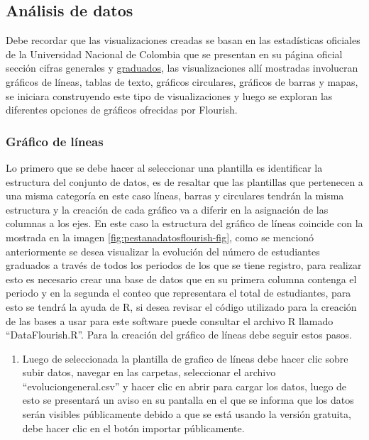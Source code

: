 \documentclass[
]{book}
\providecommand{\tightlist}{%
  \setlength{\itemsep}{0pt}\setlength{\parskip}{0pt}}
\begin{document}
\hypertarget{anuxe1lisis-de-datos}{%
\subsection{Análisis de datos}\label{anuxe1lisis-de-datos}}

Debe recordar que las visualizaciones creadas se basan en las estadísticas oficiales de la Universidad Nacional de Colombia que se presentan en su página oficial sección cifras generales y \href{http://estadisticas.unal.edu.co/menu-principal/cifras-generales/cifras-generales/?tx_estadisticaunal_listcategorias\%5Bcategoria\%5D=16\&tx_estadisticaunal_listcategorias\%5Baction\%5D=show\&tx_estadisticaunal_listcategorias\%5Bcontroller\%5D=Categoria\&cHash=bd354edbd23f35d536276c079984177c}{graduados}, las visualizaciones allí mostradas involucran gráficos de líneas, tablas de texto, gráficos circulares, gráficos de barras y mapas, se iniciara construyendo este tipo de visualizaciones y luego se exploran las diferentes opciones de gráficos ofrecidas por Flourish.

\hypertarget{graficolineasflourish}{%
\subsubsection{Gráfico de líneas}\label{graficolineasflourish}}

Lo primero que se debe hacer al seleccionar una plantilla es identificar la estructura del conjunto de datos, es de resaltar que las plantillas que pertenecen a una misma categoría en este caso líneas, barras y circulares tendrán la misma estructura y la creación de cada gráfico va a diferir en la asignación de las columnas a los ejes. En este caso la estructura del gráfico de líneas coincide con la mostrada en la imagen \ref{fig:pestanadatosflourish-fig}, como se mencionó anteriormente se desea visualizar la evolución del número de estudiantes graduados a través de todos los periodos de los que se tiene registro, para realizar esto es necesario crear una base de datos que en su primera columna contenga el periodo y en la segunda el conteo que representara el total de estudiantes, para esto se tendrá la ayuda de R, si desea revisar el código utilizado para la creación de las bases a usar para este software puede consultar el archivo R llamado ``DataFlourish.R''. Para la creación del gráfico de líneas debe seguir estos pasos.

\begin{enumerate}
\def\labelenumi{\arabic{enumi}.}
\tightlist
\item
  Luego de seleccionada la plantilla de grafico de líneas debe hacer clic sobre subir datos, navegar en las carpetas, seleccionar el archivo ``evoluciongeneral.csv'' y hacer clic en abrir para cargar los datos, luego de esto se presentará un aviso en su pantalla en el que se informa que los datos serán visibles públicamente debido a que se está usando la versión gratuita, debe hacer clic en el botón importar públicamente.
\end{enumerate}
\end{document}
